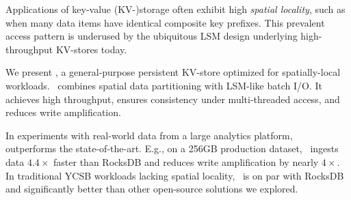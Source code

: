 Applications of key-value (KV-)storage often exhibit high \emph{spatial locality}, such as  
when many data items have identical composite key prefixes.  
This prevalent access pattern is underused by the ubiquitous LSM  design underlying 
high-throughput KV-stores today.

We present \sys, a general-purpose persistent KV-store optimized for spatially-local %
workloads. 
\sys\ combines spatial data partitioning with LSM-like  batch I/O. 
It achieves high throughput, 
ensures consistency under multi-threaded access,   
and reduces write amplification. 

In experiments with real-world data from a large analytics platform,  \sys\  
outperforms the state-of-the-art. E.g., on a 256GB production dataset, 
\sys\ ingests data $4.4\times$ faster than RocksDB  %
and reduces write amplification by nearly $4\times$. 
In traditional YCSB workloads lacking spatial locality, %
\sys\ is on par with RocksDB and significantly better than other open-source solutions we explored.
